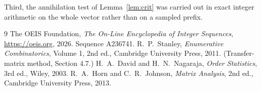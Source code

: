 \documentclass[11pt,a4paper]{article}
\theoremstyle{plain}
\theoremstyle{definition}
\begin{document}
Third, the annihilation test of Lemma~\ref{lem:crit} was carried out in exact integer
arithmetic on the whole vector rather than on a sampled prefix.

\begin{thebibliography}{9}
 The OEIS Foundation, \emph{The On-Line Encyclopedia of Integer
Sequences}, \url{https://oeis.org}, 2026. Sequence A236741.
 R.~P.~Stanley, \emph{Enumerative Combinatorics}, Volume 1, 2nd ed.,
Cambridge University Press, 2011. (Transfer-matrix method, Section 4.7.)
 H.~A.~David and H.~N.~Nagaraja, \emph{Order Statistics}, 3rd ed., Wiley,
2003.
 R.~A.~Horn and C.~R.~Johnson, \emph{Matrix Analysis}, 2nd ed., Cambridge
University Press, 2013.
\end{thebibliography}
\end{document}

